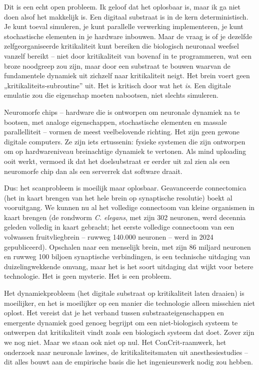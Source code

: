 \documentclass[11pt, twoside, openright]{book}
\begin{document}
Dit is een echt open probleem. Ik geloof dat het oplosbaar is, maar ik ga niet doen alsof het makkelijk is. Een digitaal substraat is in de kern deterministisch. Je kunt toeval simuleren, je kunt parallelle verwerking implementeren, je kunt stochastische elementen in je hardware inbouwen. Maar de vraag is of je dezelfde zelfgeorganiseerde kritikaliteit kunt bereiken die biologisch neuronaal weefsel vanzelf bereikt -- niet door kritikaliteit van bovenaf in te programmeren, wat een broze noodgreep zou zijn, maar door een substraat te bouwen waarvan de fundamentele dynamiek uit zichzelf naar kritikaliteit neigt. Het brein voert geen „kritikaliteits-subroutine” uit. Het is kritisch door wat het \textit{is}. Een digitale emulatie zou die eigenschap moeten nabootsen, niet slechts simuleren.

Neuromorfe chips -- hardware die is ontworpen om neuronale dynamiek na te bootsen, met analoge eigenschappen, stochastische elementen en massale parallelliteit -- vormen de meest veelbelovende richting. Het zijn geen gewone digitale computers. Ze zijn iets ertussenin: fysieke systemen die zijn ontworpen om op hardwareniveau breinachtige dynamiek te vertonen. Als mind uploading ooit werkt, vermoed ik dat het doelsubstraat er eerder uit zal zien als een neuromorfe chip dan als een serverrek dat software draait.

Dus: het scanprobleem is moeilijk maar oplosbaar. Geavanceerde connectomica (het in kaart brengen van het hele brein op synaptische resolutie) boekt al vooruitgang. We kunnen nu al het volledige connectoom van kleine organismen in kaart brengen (de rondworm \textit{C. elegans}, met zijn 302 neuronen, werd decennia geleden volledig in kaart gebracht; het eerste volledige connectoom van een volwassen fruitvliegbrein -- ruwweg 140.000 neuronen -- werd in 2024 gepubliceerd). Opschalen naar een menselijk brein, met zijn 86 miljard neuronen en ruwweg 100 biljoen synaptische verbindingen, is een technische uitdaging van duizelingwekkende omvang, maar het is het soort uitdaging dat wijkt voor betere technologie. Het is geen mysterie. Het is een probleem.

Het dynamiekprobleem (het digitale substraat op kritikaliteit laten draaien) is moeilijker, en het is moeilijker op een manier die technologie alleen misschien niet oplost. Het vereist dat je het verband tussen substraateigenschappen en emergente dynamiek goed genoeg begrijpt om een niet-biologisch systeem te ontwerpen dat kritikaliteit vindt zoals een biologisch systeem dat doet. Zover zijn we nog niet. Maar we staan ook niet op nul. Het ConCrit-raamwerk, het onderzoek naar neuronale lawines, de kritikaliteitsmaten uit anesthesiestudies -- dit alles bouwt aan de empirische basis die het ingenieurswerk nodig zou hebben.
\end{document}
